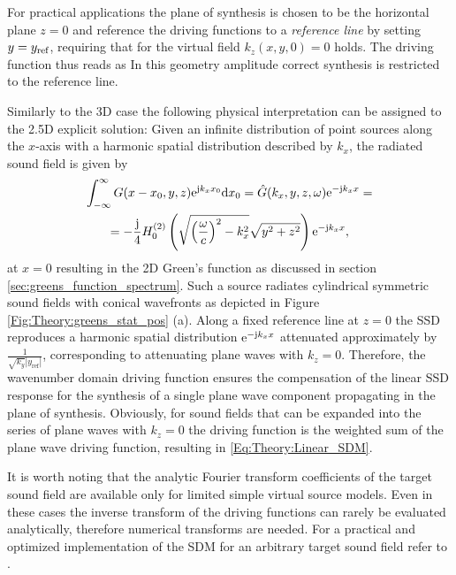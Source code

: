 For practical applications the plane of synthesis is chosen to be the horizontal plane $z=0$ and reference the driving functions to a \emph{reference line} by setting $y = y_{\mathrm{ref}}$, requiring that for the virtual field $k_z(x,y,0) = 0$ holds.
The driving function thus reads as
In this geometry amplitude correct synthesis is restricted to the reference line.

Similarly to the 3D case the following physical interpretation can be assigned to the 2.5D explicit solution:
Given an infinite distribution of point sources along the $x$-axis with a harmonic spatial distribution described by $k_x$, the radiated sound field is given by
\begin{multline}
\int_{-\infty}^{\infty} G(x - x_0,y,z) \mathrm{e}^{\mathrm{j} k_x x_0} \mathrm{d} x_0 = \hat{G}(k_x,y,z,\omega) \mathrm{e}^{-\mathrm{j} k_x x} = \\
=  -\frac{\mathrm{j}}{4} H_0^{(2)}\left( \sqrt{\left( \frac{\omega}{c} \right)^2-k_x^2} \sqrt{y^2+z^2} \right)  \mathrm{e}^{-\mathrm{j} k_x x},
\end{multline}
at $x=0$ resulting in the 2D Green's function as discussed in section \ref{sec:greens_function_spectrum}.
Such a source radiates cylindrical symmetric sound fields with conical wavefronts as depicted in Figure \eqref{Fig:Theory:greens_stat_pos} (a). 
Along a fixed reference line at $z=0$ the SSD reproduces a harmonic spatial distribution $\mathrm{e}^{-\mathrm{j} k_x x}$ attenuated approximately by $\frac{1}{\sqrt{k_y}|y_{\mathrm{ref}}|}$, corresponding to attenuating plane waves with $k_z=0$.
Therefore, the wavenumber domain driving function ensures the compensation of the linear SSD response for the synthesis of a single plane wave component propagating in the plane of synthesis.
Obviously, for sound fields that can be expanded into the series of plane waves with $k_z=0$ the driving function is the weighted sum of the plane wave driving function, resulting in \eqref{Eq:Theory:Linear_SDM}.

It is worth noting that the analytic Fourier transform coefficients of the target sound field are available only for limited simple virtual source models. 
Even in these cases the inverse transform of the driving functions can rarely be evaluated analytically, therefore numerical transforms are needed.
For a practical and optimized implementation of the SDM for an arbitrary target sound field refer to \cite{ahrens2013a:efficientSDM}.

